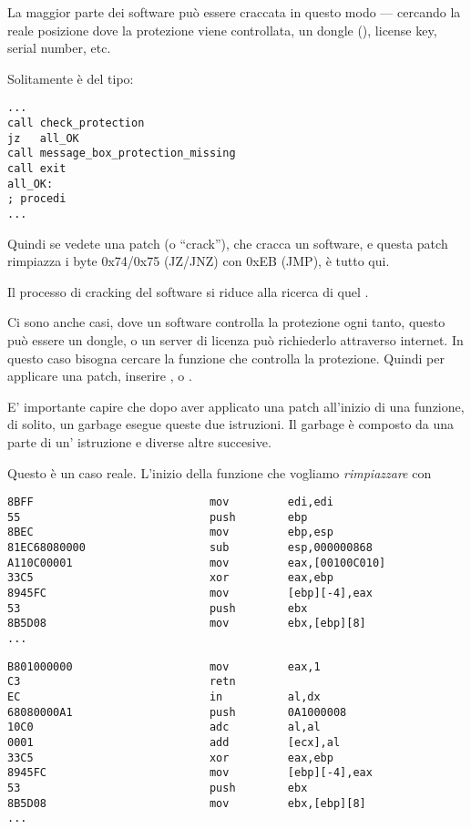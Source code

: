 \myindex{\SoftwareCracking}

La maggior parte dei software può essere craccata in questo modo --- cercando la reale posizione dove la protezione viene controllata, un dongle
(), license key, serial number, etc.

Solitamente è del tipo:

\begin{lstlisting}[style=customasmx86]
...
call check_protection
jz   all_OK
call message_box_protection_missing
call exit
all_OK:
; procedi
...
\end{lstlisting}

Quindi se vedete una patch (o ``crack''), che cracca un software, e questa patch rimpiazza i byte 0x74/0x75 (JZ/JNZ) con 0xEB (JMP),
è tutto qui.

Il processo di cracking del software si riduce alla ricerca di quel .

\myhrule{}

Ci sono anche casi, dove un software controlla la protezione ogni tanto, questo può essere un dongle, o un server di licenza può richiederlo attraverso internet.
In questo caso bisogna cercare la funzione che controlla la protezione.
Quindi per applicare una patch, inserire , o .

E' importante capire che dopo aver applicato una patch all'inizio di una funzione, di solito, un garbage esegue queste due istruzioni.
Il garbage è composto da una parte di un' istruzione e diverse altre succesive.

Questo è un caso reale.
L'inizio della funzione che vogliamo \emph{rimpiazzare} con 

\begin{lstlisting}[style=customasmx86,caption=Prima]
8BFF                           mov         edi,edi
55                             push        ebp
8BEC                           mov         ebp,esp
81EC68080000                   sub         esp,000000868
A110C00001                     mov         eax,[00100C010]
33C5                           xor         eax,ebp
8945FC                         mov         [ebp][-4],eax
53                             push        ebx
8B5D08                         mov         ebx,[ebp][8]
...
\end{lstlisting}

\begin{lstlisting}[style=customasmx86,caption=Dopo]
B801000000                     mov         eax,1
C3                             retn
EC                             in          al,dx
68080000A1                     push        0A1000008
10C0                           adc         al,al
0001                           add         [ecx],al
33C5                           xor         eax,ebp
8945FC                         mov         [ebp][-4],eax
53                             push        ebx
8B5D08                         mov         ebx,[ebp][8]
...
\end{lstlisting}

